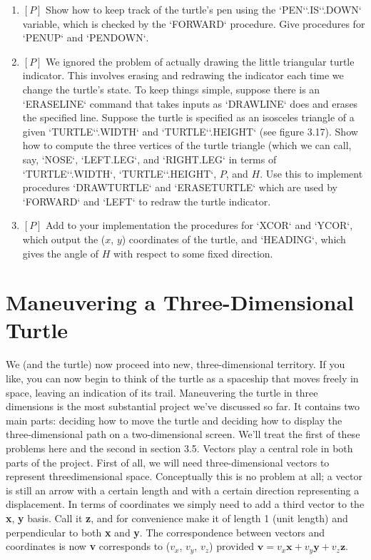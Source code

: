 \documentclass{book}
\begin{document}
\begin{enumerate}
\item $[P]$ Show how to keep track of the turtle's pen using the \textsc{`PEN`}\textsc{`.IS`}\textsc{`.DOWN`}
variable, which is checked by the \textsc{`FORWARD`} procedure. Give procedures
for \textsc{`PENUP`} and \textsc{`PENDOWN`}.
\item $[P]$ We ignored the problem of actually drawing the little triangular turtle indicator. This involves erasing and redrawing the indicator
each time we change the turtle's state. To keep things simple, suppose
there is an \textsc{`ERASELINE`} command that takes inputs as \textsc{`DRAWLINE`} does
and erases the specified line. Suppose the turtle is specified as an isosceles triangle of a given \textsc{`TURTLE`}\textsc{`.WIDTH`} and \textsc{`TURTLE`}\textsc{`.HEIGHT`} (see figure
3.17). Show how to compute the three vertices of the turtle triangle
(which we can call, say, \textsc{`NOSE`}, \textsc{`LEFT.LEG`}, and \textsc{`RIGHT.LEG`} in terms of
\textsc{`TURTLE`}\textsc{`.WIDTH`}, \textsc{`TURTLE`}\textsc{`.HEIGHT`}, $P$, and $H$. Use this to implement procedures \textsc{`DRAWTURTLE`} and \textsc{`ERASETURTLE`} which are used by \textsc{`FORWARD`} and
\textsc{`LEFT`} to redraw the turtle indicator.  
\item $[P]$ Add to your implementation the procedures for \textsc{`XCOR`} and \textsc{`YCOR`},
which output the ($x$, $y$) coordinates of the turtle, and \textsc{`HEADING`}, which
gives the angle of $H$ with respect to some fixed direction.
\end{enumerate}

\section{Maneuvering a Three-Dimensional Turtle}

We (and the turtle) now proceed into new, three-dimensional territory.
If you like, you can now begin to think of the turtle as a spaceship that
moves freely in space, leaving an indication of its trail. Maneuvering the
turtle in three dimensions is the most substantial project we've discussed
so far. It contains two main parts: deciding how to move the turtle and
deciding how to display the three-dimensional path on a two-dimensional
screen. We'll treat the first of these problems here and the second in
section 3.5. Vectors play a central role in both parts of the project.
First of all, we will need three-dimensional vectors to represent threedimensional space. Conceptually this is no problem at all; a vector is still
an arrow with a certain length and with a certain direction representing
a displacement. In terms of coordinates we simply need to add a third
vector to the \textbf{x}, \textbf{y} basis. Call it \textbf{z}, and for convenience make it of length
1 (unit length) and perpendicular to both \textbf{x} and \textbf{y}. The correspondence
between vectors and coordinates is now
 \textbf{v} corresponds to ($v_x$, $v_y$, $v_z$) provided $\mathbf{v} = v_x\mathbf{x} + v_y\mathbf{y} + v_z\mathbf{z}$.
\end{document}

